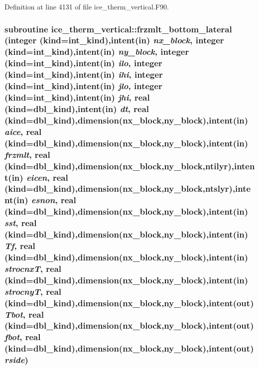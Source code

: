 Definition at line 4131 of file ice\_\-therm\_\-vertical.F90.\hypertarget{namespaceice__therm__vertical_ae86ac5bb13d456664da2d8a1aae2f80c}{
\subsubsection[{frzmlt\_\-bottom\_\-lateral}]{\setlength{\rightskip}{0pt plus 5cm}subroutine ice\_\-therm\_\-vertical::frzmlt\_\-bottom\_\-lateral (integer (kind=int\_\-kind),intent(in) {\em nx\_\-block}, \/  integer (kind=int\_\-kind),intent(in) {\em ny\_\-block}, \/  integer (kind=int\_\-kind),intent(in) {\em ilo}, \/  integer (kind=int\_\-kind),intent(in) {\em ihi}, \/  integer (kind=int\_\-kind),intent(in) {\em jlo}, \/  integer (kind=int\_\-kind),intent(in) {\em jhi}, \/  real (kind=dbl\_\-kind),intent(in) {\em dt}, \/  real (kind=dbl\_\-kind),dimension(nx\_\-block,ny\_\-block),intent(in) {\em aice}, \/  real (kind=dbl\_\-kind),dimension(nx\_\-block,ny\_\-block),intent(in) {\em frzmlt}, \/  real (kind=dbl\_\-kind),dimension(nx\_\-block,ny\_\-block,ntilyr),intent(in) {\em eicen}, \/  real (kind=dbl\_\-kind),dimension(nx\_\-block,ny\_\-block,ntslyr),intent(in) {\em esnon}, \/  real (kind=dbl\_\-kind),dimension(nx\_\-block,ny\_\-block),intent(in) {\em sst}, \/  real (kind=dbl\_\-kind),dimension(nx\_\-block,ny\_\-block),intent(in) {\em Tf}, \/  real (kind=dbl\_\-kind),dimension(nx\_\-block,ny\_\-block),intent(in) {\em strocnxT}, \/  real (kind=dbl\_\-kind),dimension(nx\_\-block,ny\_\-block),intent(in) {\em strocnyT}, \/  real (kind=dbl\_\-kind),dimension(nx\_\-block,ny\_\-block),intent(out) {\em Tbot}, \/  real (kind=dbl\_\-kind),dimension(nx\_\-block,ny\_\-block),intent(out) {\em fbot}, \/  real (kind=dbl\_\-kind),dimension(nx\_\-block,ny\_\-block),intent(out) {\em rside})}}
\label{namespaceice__therm__vertical_ae86ac5bb13d456664da2d8a1aae2f80c}


